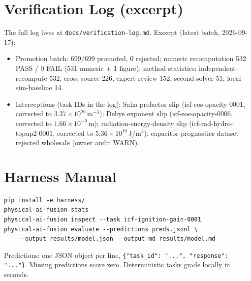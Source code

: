 \section{Verification Log (excerpt)}
\label{app:vlog}
The full log lives at \texttt{docs/verification-log.md}. Excerpt (latest batch, 2026-09-17):
\begin{itemize}
    \item Promotion batch: 699/699 promoted, 0 rejected; numeric recomputation 532 PASS / 0 FAIL (531 numeric + 1 figure); method statistics: independent-recompute 532, cross-source 226, expert-review 152, second-solver 51, local-sim-baseline 14.
    \item Interceptions (task IDs in the log): Saha prefactor slip (icf-eos-opacity-0001, corrected to $3.37\times10^{26}\,\mathrm{m^{-3}}$); Debye exponent slip (icf-eos-opacity-0006, corrected to $1.66\times10^{-9}$\,m); radiation-energy-density slip (icf-rad-hydro-topup2-0001, corrected to $5.36\times10^{10}$\,J/m$^3$); capacitor-prognostics dataset rejected wholesale (owner audit WARN).
\end{itemize}

\section{Harness Manual}
\label{app:harness}
\begin{lstlisting}
pip install -e harness/
physical-ai-fusion stats
physical-ai-fusion inspect --task icf-ignition-gain-0001
physical-ai-fusion evaluate --predictions preds.jsonl \
    --output results/model.json --output-md results/model.md
\end{lstlisting}
Predictions: one JSON object per line, \texttt{\{"task\_id": "...", "response": "..."\}}. Missing predictions score zero. Deterministic tasks grade locally in seconds.

